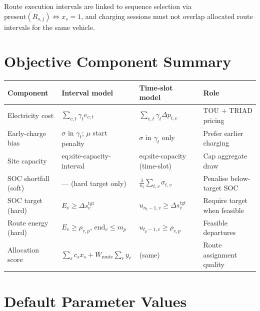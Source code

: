\documentclass[11pt,a4paper]{article}
\newcommand{\1}{\mathbf{1}}
\begin{document}
Route execution intervals are linked to sequence selection via
$\mathrm{present}(R_{s,j}) \Leftrightarrow x_s = 1$, and charging sessions must not
overlap allocated route intervals for the same vehicle.

\section{Objective Component Summary}

\begin{center}
\begin{tabular}{@{}llll@{}}
\toprule
Component & Interval model & Time-slot model & Role \\
\midrule
Electricity cost & $\sum_{v,t} \gamma_t e_{v,t}$ & $\sum_{v,t} \gamma_t \Delta p_{t,v}$ & TOU + TRIAD pricing \\
Early-charge bias & $\sigma$ in $\gamma_t$; $\mu$ start penalty & $\sigma$ in $\gamma_t$ only & Prefer earlier charging \\
Site capacity & eq:site-capacity-interval & eq:site-capacity (time-slot) & Cap aggregate draw \\
SOC shortfall (soft) & --- (hard target only) & $\frac{\lambda}{n_t}\sum_{t,v}\sigma_{t,v}$ & Penalise below-target SOC \\
SOC target (hard) & $E_v \ge \Delta s_v^{\mathrm{tgt}}$ & $u_{n_t-1,v} \ge \Delta s_v^{\mathrm{tgt}}$ & Require target when feasible \\
Route energy (hard) & $E_v \ge \rho_{v,p}$, $\mathrm{end}_v \le m_p$ & $u_{t_p-1,v} \ge \rho_{v,p}$ & Feasible departures \\
Allocation score & $\sum_s c_s x_s + W_{\mathrm{route}}\sum_r y_r$ & (same) & Route assignment quality \\
\bottomrule
\end{tabular}
\end{center}

\section{Default Parameter Values}
\end{document}
